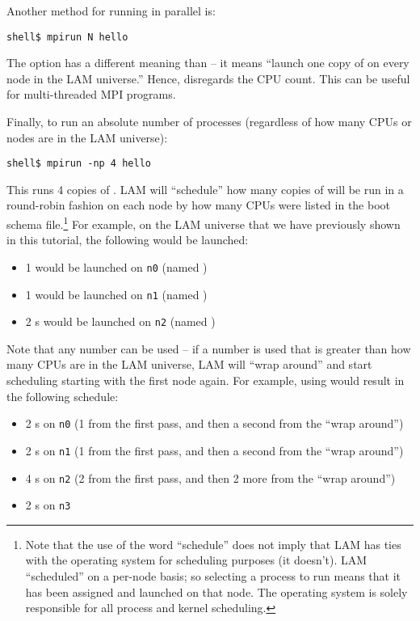 Another method for running in parallel is:

\lstset{style=lam-cmdline}
\begin{lstlisting}
shell$ mpirun N hello
\end{lstlisting}

The  option has a different meaning than  -- it
means ``launch one copy of  on every node in the LAM
universe.''  Hence,  disregards the CPU count.  This can be
useful for multi-threaded MPI programs.

Finally, to run an absolute number of processes (regardless of how
many CPUs or nodes are in the LAM universe):

\lstset{style=lam-cmdline}
\begin{lstlisting}
shell$ mpirun -np 4 hello
\end{lstlisting}

This runs 4 copies of .  LAM will ``schedule'' how many
copies of  will be run in a round-robin fashion on each
node by how many CPUs were listed in the boot schema
file.\footnote{Note that the use of the word ``schedule'' does not
  imply that LAM has ties with the operating system for scheduling
  purposes (it doesn't).  LAM ``scheduled'' on a per-node basis; so
  selecting a process to run means that it has been assigned and
  launched on that node.  The operating system is solely responsible
  for all process and kernel scheduling.}  For example, on the LAM
universe that we have previously shown in this tutorial, the following
would be launched:

\begin{itemize}
\item 1  would be launched on {\tt n0} (named
  )
\item 1  would be launched on {\tt n1} (named
  )
\item 2 s would be launched on {\tt n2} (named
  )
\end{itemize}

Note that any number can be used -- if a number is used that is
greater than how many CPUs are in the LAM universe, LAM will ``wrap
around'' and start scheduling starting with the first node again.  For
example, using  would result in the following
schedule:

\begin{itemize}
\item 2 s on {\tt n0} (1 from the first pass, and then a
  second from the ``wrap around'')
\item 2 s on {\tt n1} (1 from the first pass, and then a
  second from the ``wrap around'')
\item 4 s on {\tt n2} (2 from the first pass, and then 2
  more from the ``wrap around'')
\item 2 s on {\tt n3}
\end{itemize}

